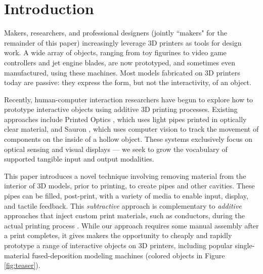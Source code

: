 
\section{Introduction}
Makers, researchers, and professional designers (jointly ``makers" for the remainder of this paper) increasingly leverage 3D printers as tools for design work.  A wide array of objects, ranging from toy figurines to video game controllers and jet engine blades, are now prototyped, and sometimes even manufactured, using these machines.  Most models fabricated on 3D printers today are passive: they express the form, but not the interactivity, of an object.  

Recently, human-computer interaction researchers have begun to explore how to prototype interactive objects using additive 3D printing processes.
Existing approaches include Printed Optics \cite{Willis-printedoptics}, which uses light pipes printed in optically clear material, and Sauron \cite{Savage-sauron}, which uses computer vision to track the movement of components on the inside of a hollow object. These systems exclusively focus on optical sensing and visual displays --- we seek to grow the vocabulary of supported tangible input and output modalities.

This paper introduces a novel technique involving removing material from the interior of 3D models, prior to printing, to create pipes and other cavities.  These pipes can be filled, post-print, with a variety of media to enable input, display, and tactile feedback.  This {\em subtractive} approach is complementary to {\em additive} approaches that inject custom print materials, such as conductors, during the actual printing process \cite{Sells-reprap}. While our approach requires some manual assembly after a print completes, it gives makers the opportunity to cheaply and rapidly prototype a range of interactive objects on 3D printers, including popular single-material fused-deposition modeling machines (colored objects in Figure \ref{fig:teaser}).

